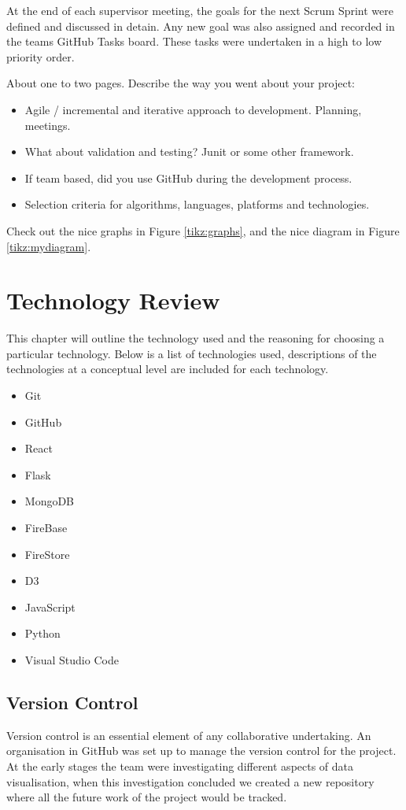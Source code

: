At the end of each supervisor meeting, the goals for the next Scrum Sprint were defined and discussed in detain. Any new goal was also assigned and recorded in the teams GitHub Tasks board. These tasks were undertaken in a high to low priority order.

\vspace{70mm} %



About one to two pages.
Describe the way you went about your project:
\begin{itemize}
\item Agile / incremental and iterative approach to development. Planning, meetings.
\item What about validation and testing? Junit or some other framework.
\item If team based, did you use GitHub during the development process.
\item Selection criteria for algorithms, languages, platforms and technologies.
\end{itemize}
Check out the nice graphs in Figure \ref{tikz:graphs}, and the nice diagram in Figure \ref{tikz:mydiagram}.



\chapter{Technology Review}
This chapter will outline the technology used and the reasoning for choosing a particular technology. Below is a list of technologies used, descriptions of the technologies at a conceptual level are included for each technology.
\begin{itemize}
\item Git
\item GitHub
\item React
\item Flask
\item MongoDB
\item FireBase
\item FireStore
\item D3
\item JavaScript
\item Python
\item Visual Studio Code


\end{itemize}

\section{Version Control}
Version control is an essential element of any collaborative undertaking. An organisation in GitHub was set up to manage the version control for the project. At the early stages the team were investigating different aspects of data visualisation, when this investigation concluded we created a new repository where all the future work of the project would be tracked.
